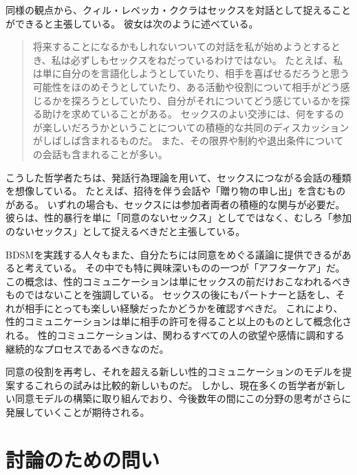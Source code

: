 \documentclass[paper=a4,book,openany]{jlreq}
\begin{document}
同様の観点から、クィル・レベッカ・ククラはセックスを対話として捉えることができると主張している。
彼女は次のように述べている。

\begin{quote}
将来することになるかもしれないついての対話を私が始めようとするとき、私は必ずしもセックスをねだっているわけではない。
たとえば、私は単に自分のを言語化しようとしていたり、相手を喜ばせるだろうと思う可能性をほのめそうとしていたり、ある活動や役割について相手がどう感じるかを探ろうとしていたり、自分がそれについてどう感じているかを探る助けを求めていることがある。
セックスのよい交渉には、何をするのが楽しいだろうかということについての積極的な共同のディスカッションがしばしば含まれるものだ。
また、その限界や制約や退出条件についての会話も含まれることが多い。
\citep[p.76]{kukla18:_thats_what_she_said}
\end{quote}

こうした哲学者たちは、発話行為理論を用いて、セックスにつながる会話の種類を想像している。
たとえば、招待を伴う会話や「贈り物の申し出」を含むものがある\citep[p.74]{kukla18:_thats_what_she_said}。
いずれの場合も、セックスには参加者両者の積極的な関与が必要だ。
彼らは、性的暴行を単に「同意のないセックス」としてではなく、むしろ「参加のないセックス」として捉えるべきだと主張している。

BDSMを実践する人々もまた、自分たちには同意をめぐる議論に提供できるがあると考えている。
その中でも特に興味深いものの一つが「アフターケア」だ。
この概念は、性的コミュニケーションは単にセックスの前だけおこなわれるべきものではないことを強調している。
セックスの後にもパートナーと話をし、それが相手にとっても楽しい経験だったかどうかを確認すべきだ。
これにより、性的コミュニケーションは単に相手の許可を得ること以上のものとして概念化される。
性的コミュニケーションは、関わるすべての人の欲望や感情に調和する継続的なプロセスであるべきなのだ。

同意の役割を再考し、それを超える新しい性的コミュニケーションのモデルを提案するこれらの試みは比較的新しいものだ。
しかし、現在多くの哲学者が新しい同意モデルの構築に取り組んでおり、今後数年の間にこの分野の思考がさらに発展していくことが期待される。

\section{討論のための問い}
\end{document}
